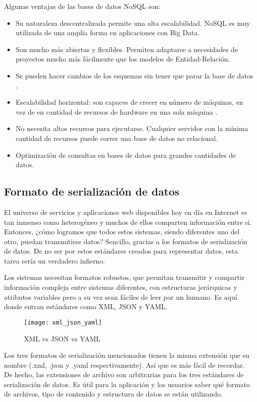 Algunas ventajas de las bases de datos NoSQL son:

\begin{itemize}
  \item Su naturaleza descentralizada permite una alta escalabilidad. NoSQL es muy utilizada de una amplia forma en aplicaciones con Big Data.
  \item Son mucho más abiertas y flexibles. Permiten adaptarse a necesidades de proyectos mucho más fácilmente que los modelos de Entidad-Relación.
  \item Se pueden hacer cambios de los esquemas sin tener que parar la base de datos \cite{bd8}.
  \item Escalabilidad horizontal: son capaces de crecer en número de máquinas, en vez de en cantidad de recursos de hardware en una sola máquina \cite{bd8}.
  \item No necesita altos recursos para ejecutarse. Cualquier servidor con la mínima cantidad de recursos puede correr una base de datos no relacional.
  \item Optimización de consultas en bases de datos para grandes cantidades de datos.
\end{itemize}

\subsection{Formato de serialización de datos}

El universo de servicios y aplicaciones web disponibles hoy en día en Internet es tan inmenso como heterogéneo y muchos de ellos comparten información entre sí. Entonces, ¿cómo logramos que todos estos sistemas, siendo diferentes uno del otro, puedan transmitirse datos? Sencillo, gracias a los formatos de serialización de datos. De no ser por estos estándares creados para representar datos, esta tarea sería un verdadero infierno.

Los sistemas necesitan formatos robustos, que permitan transmitir y compartir información compleja entre sistemas diferentes, con estructuras jerárquicas y atributos variables pero a su vez sean fáciles de leer por un humano. Es aquí donde entran estándares como XML, JSON y YAML.

\begin{figure}[htp!]
  \centering
  \texttt{[image: xml\_json\_yaml]}
  \caption{XML vs JSON vs YAML}
  \label{fig:xml_json_yaml}
\end{figure}

Los tres formatos de serialización mencionados tienen la misma extensión que su nombre (.xml, .json y .yaml respectivamente). Así que es más fácil de recordar. De hecho, las extensiones de archivo son arbitrarias para los tres estándares de serialización de datos. Es útil para la aplicación y los usuarios saber qué formato de archivos, tipo de contenido y estructura de datos se están utilizando.

